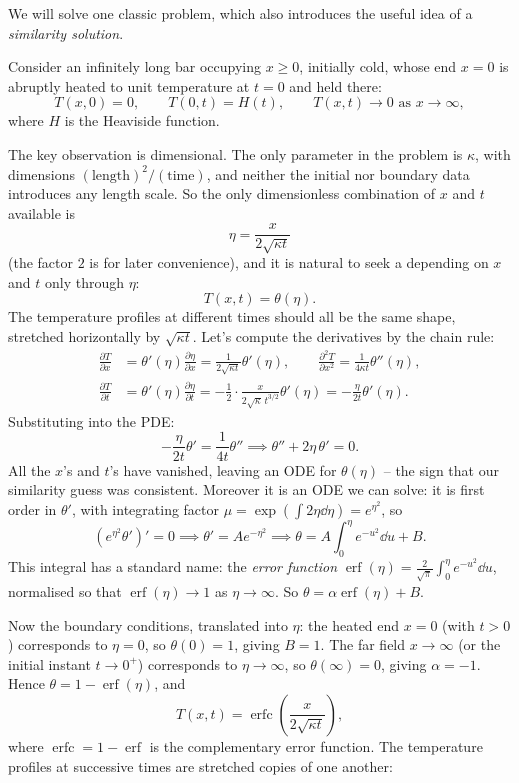 We will solve one classic problem, which also introduces the useful idea of a \emph{similarity solution}.

\begin{example}
	Consider an infinitely long bar occupying $x \geq 0$, initially cold, whose end $x = 0$ is abruptly heated to unit temperature at $t = 0$ and held there:
	$$
	T(x, 0) = 0, \qquad T(0, t) = H(t), \qquad T(x, t) \to 0 \text{ as } x \to \infty,
	$$
	where $H$ is the Heaviside function.

	The key observation is dimensional. The only parameter in the problem is $\kappa$, with dimensions $(\text{length})^2/(\text{time})$, and neither the initial nor boundary data introduces any length scale. So the only dimensionless combination of $x$ and $t$ available is
	$$
	\eta = \frac{x}{2\sqrt{\kappa t}}
	$$
	(the factor $2$ is for later convenience), and it is natural to seek a  depending on $x$ and $t$ only through $\eta$:
	$$
	T(x, t) = \theta(\eta).
	$$
	The temperature profiles at different times should all be the same shape, stretched horizontally by $\sqrt{\kappa t}$. Let's compute the derivatives by the chain rule:
	\begin{align*}
		\frac{\partial T}{\partial x} &= \theta'(\eta) \frac{\partial \eta}{\partial x} = \frac{1}{2\sqrt{\kappa t}}\theta'(\eta), \qquad
		\frac{\partial^2 T}{\partial x^2} = \frac{1}{4 \kappa t} \theta''(\eta), \\
		\frac{\partial T}{\partial t} &= \theta'(\eta) \frac{\partial \eta}{\partial t} = -\frac{1}{2} \cdot \frac{x}{2\sqrt{\kappa}\, t^{3/2}} \theta'(\eta) = -\frac{\eta}{2t}\theta'(\eta).
	\end{align*}
	Substituting into the PDE:
	$$
	-\frac{\eta}{2t} \theta' = \frac{1}{4t}\theta'' \implies \theta'' + 2\eta \, \theta' = 0.
	$$
	All the $x$'s and $t$'s have vanished, leaving an ODE for $\theta(\eta)$ -- the sign that our similarity guess was consistent. Moreover it is an ODE we can solve: it is first order in $\theta'$, with integrating factor $\mu = \exp(\int 2\eta \dd\eta) = e^{\eta^2}$, so
	$$
	\left(e^{\eta^2} \theta'\right)' = 0 \implies \theta' = A e^{-\eta^2} \implies \theta = A \int_0^\eta e^{-u^2} \dd u + B.
	$$
	This integral has a standard name: the \emph{error function} $\operatorname{erf}(\eta) = \frac{2}{\sqrt\pi} \int_0^\eta e^{-u^2} \dd u$, normalised so that $\operatorname{erf}(\eta) \to 1$ as $\eta \to \infty$. So $\theta = \alpha \operatorname{erf}(\eta) + B$.

	Now the boundary conditions, translated into $\eta$: the heated end $x = 0$ (with $t > 0$) corresponds to $\eta = 0$, so $\theta(0) = 1$, giving $B = 1$. The far field $x \to \infty$ (or the initial instant $t \to 0^+$) corresponds to $\eta \to \infty$, so $\theta(\infty) = 0$, giving $\alpha = -1$. Hence $\theta = 1 - \operatorname{erf}(\eta)$, and
	$$
	T(x, t) = \operatorname{erfc}\left(\frac{x}{2 \sqrt{\kappa t}}\right),
	$$
	where $\operatorname{erfc} = 1 - \operatorname{erf}$ is the complementary error function. The temperature profiles at successive times are stretched copies of one another:


\end{example}
